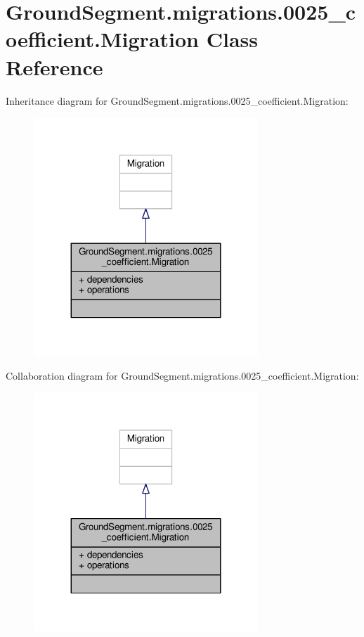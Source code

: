 \hypertarget{class_ground_segment_1_1migrations_1_10025__coefficient_1_1_migration}{}\section{Ground\+Segment.\+migrations.0025\+\_\+coefficient.Migration Class Reference}
\label{class_ground_segment_1_1migrations_1_10025__coefficient_1_1_migration}


Inheritance diagram for Ground\+Segment.\+migrations.0025\+\_\+coefficient.Migration\+:\nopagebreak
\begin{figure}[H]
\begin{center}
\leavevmode
\includegraphics[width=239pt]{class_ground_segment_1_1migrations_1_10025__coefficient_1_1_migration__inherit__graph}
\end{center}
\end{figure}


Collaboration diagram for Ground\+Segment.\+migrations.0025\+\_\+coefficient.Migration\+:\nopagebreak
\begin{figure}[H]
\begin{center}
\leavevmode
\includegraphics[width=239pt]{class_ground_segment_1_1migrations_1_10025__coefficient_1_1_migration__coll__graph}
\end{center}
\end{figure}
